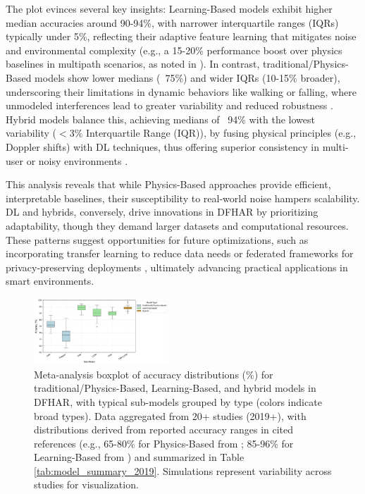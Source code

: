 \documentclass[Afour,sageh,times]{sagej}
\begin{document}
The plot evinces several key insights: Learning-Based models exhibit higher median accuracies around 90-94\%, with narrower interquartile ranges (IQRs) typically under 5\%, reflecting their adaptive feature learning that mitigates noise and environmental complexity (e.g., a 15-20\% performance boost over physics baselines in multipath scenarios, as noted in \citep{wang2021multimodal}). In contrast, traditional/Physics-Based models show lower medians (~75\%) and wider IQRs (10-15\% broader), underscoring their limitations in dynamic behaviors like walking or falling, where unmodeled interferences lead to greater variability and reduced robustness \citep{guo2019robust}. Hybrid models balance this, achieving medians of ~94\% with the lowest variability ($<$3\% Interquartile Range (IQR)), by fusing physical principles (e.g., Doppler shifts) with DL techniques, thus offering superior consistency in multi-user or noisy environments \citep{yang2022deep, zou2019wifi}.

This analysis reveals that while Physics-Based approaches provide efficient, interpretable baselines, their susceptibility to real-world noise hampers scalability. DL and hybrids, conversely, drive innovations in DFHAR by prioritizing adaptability, though they demand larger datasets and computational resources. These patterns suggest opportunities for future optimizations, such as incorporating transfer learning to reduce data needs \citep{zhou2022target} or federated frameworks for privacy-preserving deployments \citep{ma2019wifi}, ultimately advancing practical applications in smart environments.

\begin{figure}[htbp]
\centering
\includegraphics[width=0.45\textwidth]{6.dl_performance_boxplot.pdf}
\caption{Meta-analysis boxplot of accuracy distributions (\%) for traditional/Physics-Based, Learning-Based, and hybrid models in DFHAR, with typical sub-models grouped by type (colors indicate broad types). Data aggregated from 20+ studies (2019+), with distributions derived from reported accuracy ranges in cited references (e.g., 65-80\% for Physics-Based from \citep{guo2019robust}; 85-96\% for Learning-Based from \citep{chen2018wifi, wang2022caution, wang2021multimodal}) and summarized in Table \ref{tab:model_summary_2019}. Simulations represent variability across studies for visualization.}
\label{fig:dl_performance_boxplot}
\end{figure}
\end{document}

